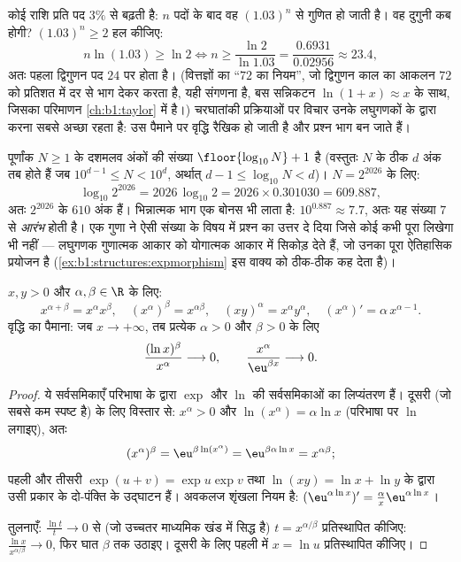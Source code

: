 \begin{example}[द्विगुणन काल]\label{ex:b1:functions:doubling}
कोई राशि प्रति पद $3\%$ से बढ़ती है: $n$ पदों के बाद वह $(1.03)^n$ से गुणित
हो जाती है। वह दुगुनी कब होगी? $(1.03)^n \geq 2$ हल कीजिए:
\[
n\ln(1.03) \geq \ln2
\iff n \geq \frac{\ln 2}{\ln 1.03}
= \frac{0.6931}{0.02956} \approx 23.4 ,
\]
अतः पहला द्विगुणन पद $24$ पर होता है। (वित्तज्ञों का ``$72$ का नियम'', जो
द्विगुणन काल का आकलन $72$ को प्रतिशत में दर से भाग देकर करता है, यही संगणना
है, बस सन्निकटन $\ln(1 + x) \approx x$ के साथ, जिसका परिमाणन
\cref{ch:b1:taylor} में है।) चरघातांकी प्रक्रियाओं पर विचार उनके लघुगणकों के
द्वारा करना सबसे अच्छा रहता है: उस पैमाने पर वृद्धि रैखिक हो जाती है और
प्रश्न भाग बन जाते हैं।
\end{example}

\begin{example}[$2^{2026}$ कितना लंबा है?]\label{ex:b1:functions:digits}
पूर्णांक $N \geq 1$ के दशमलव अंकों की संख्या $\floor{\log_{10} N} + 1$ है
(वस्तुतः $N$ के ठीक $d$ अंक तब होते हैं जब $10^{d-1} \leq N < 10^d$, अर्थात्
$d - 1 \leq \log_{10}N < d$)। $N = 2^{2026}$ के लिए:
\[
\log_{10} 2^{2026} = 2026\,\log_{10}2
= 2026 \times 0.301030 = 609.887 ,
\]
अतः $2^{2026}$ के $610$ अंक हैं। भिन्नात्मक भाग एक बोनस भी लाता है:
$10^{0.887} \approx 7.7$, अतः यह संख्या $7$ से \emph{आरंभ} होती है। एक गुणा
ने ऐसी संख्या के विषय में प्रश्न का उत्तर दे दिया जिसे कोई कभी पूरा लिखेगा
भी नहीं --- लघुगणक गुणात्मक आकार को योगात्मक आकार में सिकोड़ देते हैं, जो
उनका पूरा ऐतिहासिक प्रयोजन है (\cref{ex:b1:structures:expmorphism} इस वाक्य
को ठीक-ठीक कह देता है)।
\end{example}

\begin{proposition}[घात के नियम और वृद्धि की तुलना]\label{prop:b1:functions:powerrules}
$x, y > 0$ और $\alpha, \beta \in \R$ के लिए:
\[
x^{\alpha+\beta} = x^\alpha x^\beta, \quad
(x^\alpha)^\beta = x^{\alpha\beta}, \quad
(xy)^\alpha = x^\alpha y^\alpha, \quad
(x^\alpha)' = \alpha\, x^{\alpha - 1}.
\]
वृद्धि का पैमाना: जब $x \to +\infty$, तब प्रत्येक
$\alpha > 0$ और $\beta > 0$ के लिए
\[
\frac{(\ln x)^\beta}{x^\alpha} \longrightarrow 0,
\qquad
\frac{x^\alpha}{\eu^{\beta x}} \longrightarrow 0 .
\]
\end{proposition}

\begin{proof}
ये सर्वसमिकाएँ परिभाषा के द्वारा $\exp$ और $\ln$ की सर्वसमिकाओं का लिप्यंतरण
हैं। दूसरी (जो सबसे कम स्पष्ट है) के लिए विस्तार से: $x^\alpha > 0$ और
$\ln(x^\alpha) = \alpha\ln x$ (परिभाषा पर $\ln$ लगाइए), अतः
\[
(x^\alpha)^\beta = \eu^{\beta\ln(x^\alpha)}
= \eu^{\beta\alpha\ln x} = x^{\alpha\beta} ;
\]
पहली और तीसरी $\exp(u + v) = \exp u\exp v$ तथा $\ln(xy) = \ln x + \ln y$ के
द्वारा उसी प्रकार के दो-पंक्ति के उद्घाटन हैं। अवकलज शृंखला नियम है:
$(\eu^{\alpha\ln x})' = \frac{\alpha}{x} \eu^{\alpha\ln x}$।

तुलनाएँ: $\frac{\ln t}{t} \to 0$ से (जो उच्चतर माध्यमिक खंड में सिद्ध है) $t
= x^{\alpha/\beta}$ प्रतिस्थापित कीजिए: $\frac{\ln x}{x^{\alpha/\beta}} \to
0$, फिर घात $\beta$ तक उठाइए। दूसरी के लिए पहली में $x = \ln u$ प्रतिस्थापित
कीजिए।
\end{proof}

